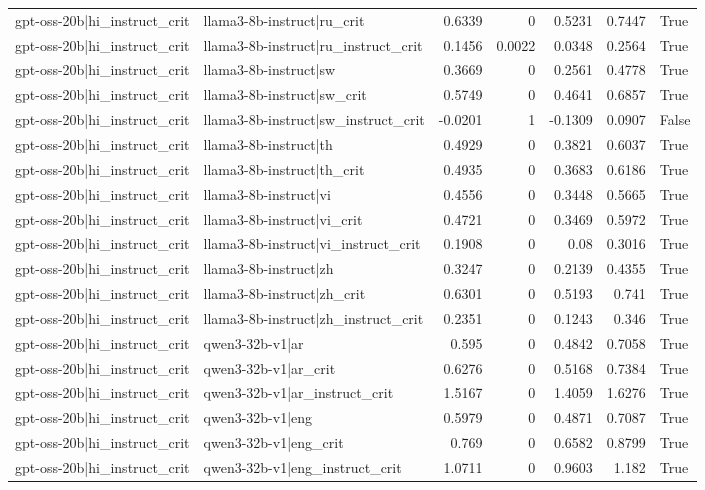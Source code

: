 \begin{table}
\begin{tabular}{l l r r r r l}
gpt-oss-20b|hi_instruct_crit & llama3-8b-instruct|ru_crit & 0.6339 & 0 & 0.5231 & 0.7447 & True \\
gpt-oss-20b|hi_instruct_crit & llama3-8b-instruct|ru_instruct_crit & 0.1456 & 0.0022 & 0.0348 & 0.2564 & True \\
gpt-oss-20b|hi_instruct_crit & llama3-8b-instruct|sw & 0.3669 & 0 & 0.2561 & 0.4778 & True \\
gpt-oss-20b|hi_instruct_crit & llama3-8b-instruct|sw_crit & 0.5749 & 0 & 0.4641 & 0.6857 & True \\
gpt-oss-20b|hi_instruct_crit & llama3-8b-instruct|sw_instruct_crit & -0.0201 & 1 & -0.1309 & 0.0907 & False \\
gpt-oss-20b|hi_instruct_crit & llama3-8b-instruct|th & 0.4929 & 0 & 0.3821 & 0.6037 & True \\
gpt-oss-20b|hi_instruct_crit & llama3-8b-instruct|th_crit & 0.4935 & 0 & 0.3683 & 0.6186 & True \\
gpt-oss-20b|hi_instruct_crit & llama3-8b-instruct|vi & 0.4556 & 0 & 0.3448 & 0.5665 & True \\
gpt-oss-20b|hi_instruct_crit & llama3-8b-instruct|vi_crit & 0.4721 & 0 & 0.3469 & 0.5972 & True \\
gpt-oss-20b|hi_instruct_crit & llama3-8b-instruct|vi_instruct_crit & 0.1908 & 0 & 0.08 & 0.3016 & True \\
gpt-oss-20b|hi_instruct_crit & llama3-8b-instruct|zh & 0.3247 & 0 & 0.2139 & 0.4355 & True \\
gpt-oss-20b|hi_instruct_crit & llama3-8b-instruct|zh_crit & 0.6301 & 0 & 0.5193 & 0.741 & True \\
gpt-oss-20b|hi_instruct_crit & llama3-8b-instruct|zh_instruct_crit & 0.2351 & 0 & 0.1243 & 0.346 & True \\
gpt-oss-20b|hi_instruct_crit & qwen3-32b-v1|ar & 0.595 & 0 & 0.4842 & 0.7058 & True \\
gpt-oss-20b|hi_instruct_crit & qwen3-32b-v1|ar_crit & 0.6276 & 0 & 0.5168 & 0.7384 & True \\
gpt-oss-20b|hi_instruct_crit & qwen3-32b-v1|ar_instruct_crit & 1.5167 & 0 & 1.4059 & 1.6276 & True \\
gpt-oss-20b|hi_instruct_crit & qwen3-32b-v1|eng & 0.5979 & 0 & 0.4871 & 0.7087 & True \\
gpt-oss-20b|hi_instruct_crit & qwen3-32b-v1|eng_crit & 0.769 & 0 & 0.6582 & 0.8799 & True \\
gpt-oss-20b|hi_instruct_crit & qwen3-32b-v1|eng_instruct_crit & 1.0711 & 0 & 0.9603 & 1.182 & True \\

\end{tabular}
\end{table}
